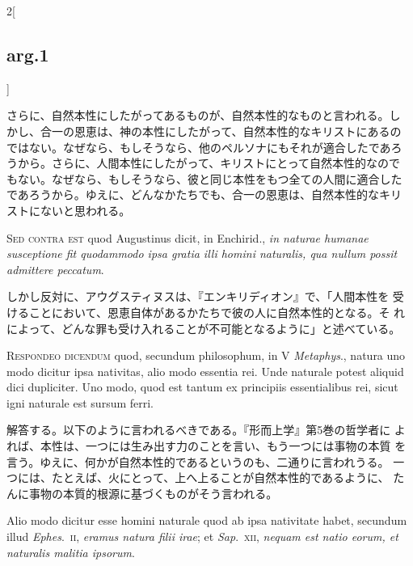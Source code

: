 \documentclass[paper=a4paper,fontsize=10pt,jafontsize=9pt,titlepage]{jlreq}
\begin{document}
\begin{paracol}{2}[\subsection{arg.1}]
\switchcolumn

さらに、自然本性にしたがってあるものが、自然本性的なものと言われる。し
かし、合一の恩恵は、神の本性にしたがって、自然本性的なキリストにあるの
ではない。なぜなら、もしそうなら、他のペルソナにもそれが適合したであろ
うから。さらに、人間本性にしたがって、キリストにとって自然本性的なので
もない。なぜなら、もしそうなら、彼と同じ本性をもつ全ての人間に適合した
であろうから。ゆえに、どんなかたちでも、合一の恩恵は、自然本性的なキリ
ストにないと思われる。

\switchcolumn*[\subsection{s.c.}]

{\scshape Sed contra est} quod Augustinus dicit, in Enchirid.,
{\itshape in naturae humanae susceptione fit quodammodo ipsa gratia
illi homini naturalis, qua nullum possit admittere peccatum}.

\switchcolumn

しかし反対に、アウグスティヌスは、『エンキリディオン』で、「人間本性を
受けることにおいて、恩恵自体があるかたちで彼の人に自然本性的となる。そ
れによって、どんな罪も受け入れることが不可能となるように」と述べている。


{\scshape Respondeo dicendum} quod, secundum philosophum, in V
{\itshape Metaphys}., natura uno modo dicitur ipsa nativitas, alio
modo essentia rei. Unde naturale potest aliquid dici dupliciter. Uno
modo, quod est tantum ex principiis essentialibus rei, sicut igni
naturale est sursum ferri.

\switchcolumn

解答する。以下のように言われるべきである。『形而上学』第5巻の哲学者に
よれば、本性は、一つには生み出す力のことを言い、もう一つには事物の本質
を言う。ゆえに、何かが自然本性的であるというのも、二通りに言われうる。
一つには、たとえば、火にとって、上へ上ることが自然本性的であるように、
たんに事物の本質的根源に基づくものがそう言われる。

\switchcolumn*

Alio modo dicitur esse homini naturale quod ab ipsa nativitate habet,
secundum illud {\itshape Ephes}.~{\scshape ii}, {\itshape eramus
natura filii irae}; et {\itshape Sap}.~{\scshape xii}, {\itshape
nequam est natio eorum, et naturalis malitia ipsorum}.


\end{paracol}
\end{document}
